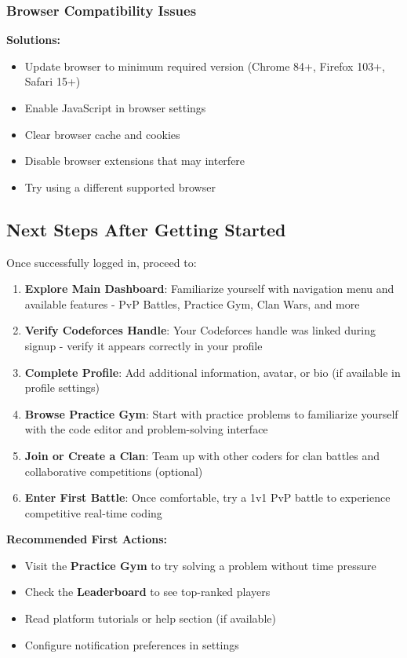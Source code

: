 \documentclass[12pt,a4paper]{article}
\begin{document}
\subsubsection{Browser Compatibility Issues}

\textbf{Solutions:}
\begin{itemize}[leftmargin=*]
\item Update browser to minimum required version (Chrome 84+, Firefox 103+, Safari 15+)
\item Enable JavaScript in browser settings
\item Clear browser cache and cookies
\item Disable browser extensions that may interfere
\item Try using a different supported browser
\end{itemize}

\subsection{Next Steps After Getting Started}

Once successfully logged in, proceed to:

\begin{enumerate}
\item \textbf{Explore Main Dashboard}: Familiarize yourself with navigation menu and available features - PvP Battles, Practice Gym, Clan Wars, and more
\item \textbf{Verify Codeforces Handle}: Your Codeforces handle was linked during signup - verify it appears correctly in your profile
\item \textbf{Complete Profile}: Add additional information, avatar, or bio (if available in profile settings)
\item \textbf{Browse Practice Gym}: Start with practice problems to familiarize yourself with the code editor and problem-solving interface
\item \textbf{Join or Create a Clan}: Team up with other coders for clan battles and collaborative competitions (optional)
\item \textbf{Enter First Battle}: Once comfortable, try a 1v1 PvP battle to experience competitive real-time coding
\end{enumerate}

\textbf{Recommended First Actions:}
\begin{itemize}[leftmargin=*]
\item Visit the \textbf{Practice Gym} to try solving a problem without time pressure
\item Check the \textbf{Leaderboard} to see top-ranked players
\item Read platform tutorials or help section (if available)
\item Configure notification preferences in settings
\end{itemize}
\end{document}
